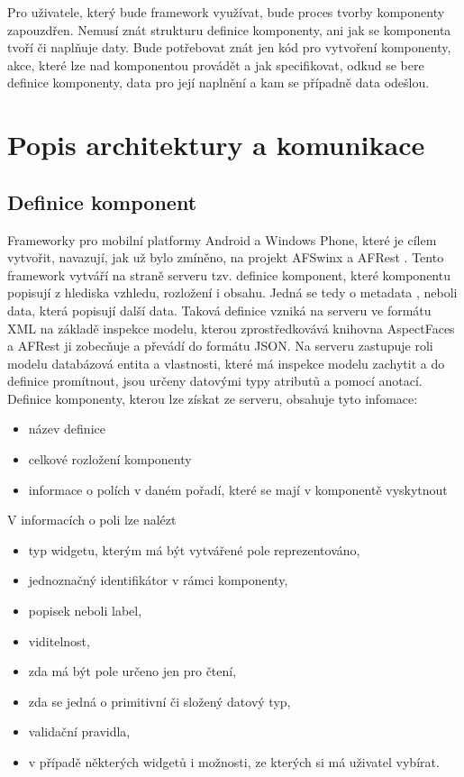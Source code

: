 Pro uživatele, který bude framework využívat, bude proces tvorby komponenty zapouzdřen. Nemusí znát strukturu definice komponenty, ani jak se komponenta tvoří či naplňuje daty. Bude potřebovat znát jen kód pro vytvoření komponenty, akce, které lze nad komponentou provádět a jak specifikovat, odkud se bere definice komponenty, data pro její naplnění a kam se případně data odešlou.

\section{Popis architektury a komunikace}
\subsection{Definice komponent}
Frameworky pro mobilní platformy Android a Windows Phone, které je cílem vytvořit, navazují, jak už bylo zmíněno, na projekt AFSwinx a AFRest \cite{tomasek-thesis}. Tento framework vytváří na straně serveru tzv. definice komponent, které komponentu popisují z hlediska vzhledu, rozložení i obsahu. Jedná se tedy o metadata \cite{metadata}, neboli data, která popisují další data. Taková definice vzniká na serveru ve formátu XML na základě inspekce modelu, kterou zprostředkovává knihovna AspectFaces a AFRest ji zobecňuje a převádí do formátu JSON. Na serveru zastupuje roli modelu databázová entita a vlastnosti, které má inspekce modelu zachytit a do definice promítnout, jsou určeny datovými typy atributů a pomocí anotací.
Definice komponenty, kterou lze získat ze serveru, obsahuje tyto infomace:
\begin{itemize}
\item název definice
\item celkové rozložení komponenty
\item informace o polích v daném pořadí, které se mají v komponentě vyskytnout
\end{itemize}
V informacích o poli lze nalézt 
\begin{itemize}
\item typ widgetu, kterým má být vytvářené pole reprezentováno,
\item jednoznačný identifikátor v rámci komponenty,
\item popisek neboli label,
\item viditelnost,
\item zda má být pole určeno jen pro čtení,
\item zda se jedná o primitivní či složený datový typ,
\item validační pravidla,
\item v případě některých widgetů i možnosti, ze kterých si má uživatel vybírat.
\end{itemize}

